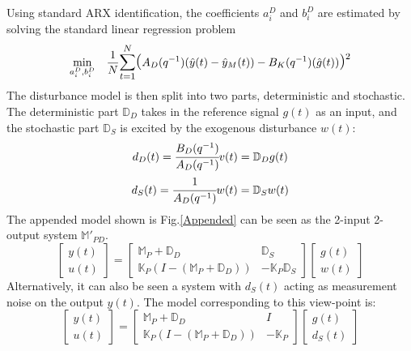 \documentclass[letterpaper, 10 pt, conference]{ieeeconf}  %
\begin{document}
	Using standard ARX identification, the coefficients $a_i^D$ and $b_i^D$ are estimated by solving the standard linear regression problem
	\begin{equation}
	\begin{aligned}
	& \underset{a_i^D,b_i^D}{\text{min}}
	& & \frac{1}{N}\mathlarger{\sum\limits_{t=1}^N}\mathlarger{\mathlarger{(}}A_D(q^{-1})(\hat{y}(t)-\hat{y}_M(t))-B_K(q^{-1})(\hat{g}(t))\mathlarger{\mathlarger{)}}^2 \\
	\end{aligned}
	\label{DSensor}
	\end{equation}
	The disturbance model is then split into two parts, deterministic and stochastic. The deterministic part $\mathbb{D}_D$ takes in the reference signal $g(t)$ as an input, and the stochastic part $\mathbb{D}_S$ is excited by the exogenous disturbance $w(t)$:
	\begin{equation*}
	\begin{matrix}
	d_D(t) = \cfrac{B_D(q^{-1})}{A_D(q^{-1})}v(t) = \mathbb{D}_D g(t) \vspace{4pt} \\  
	d_S(t) = \cfrac{1}{A_D(q^{-1})}w(t) = \mathbb{D}_S w(t)
	\end{matrix}
	\end{equation*}
	The appended model shown is Fig.\ref{Appended} can be seen as the 2-input 2-output system $\mathbb{M}'_{PD}$.
	\begin{equation}
	\begin{bmatrix}
	y(t) \\ u(t)
	\end{bmatrix} = 
	\begin{bmatrix} 
	\mathbb{M}_P+\mathbb{D}_D & \mathbb{D}_S \\
	\mathbb{K}_P(I-(\mathbb{M}_P+\mathbb{D}_D)) &  -\mathbb{K}_P\mathbb{D}_S
	\end{bmatrix}
	\begin{bmatrix}
	g(t) \\ w(t)
	\end{bmatrix}
	\label{TF_w}
	\end{equation}
	Alternatively, it can also be seen a system with $d_S(t)$ acting as measurement noise on the output $y(t)$. The model corresponding to this view-point is:
	\begin{equation}
	\begin{bmatrix}
	y(t) \\ u(t)
	\end{bmatrix} = 
	\begin{bmatrix} 
	\mathbb{M}_P+\mathbb{D}_D & I \\
	\mathbb{K}_P(I-(\mathbb{M}_P+\mathbb{D}_D)) &  -\mathbb{K}_P
	\end{bmatrix}
	\begin{bmatrix}
	g(t) \\ d_S(t)
	\end{bmatrix}
	\label{TF_d}
	\end{equation} 
\end{document}
